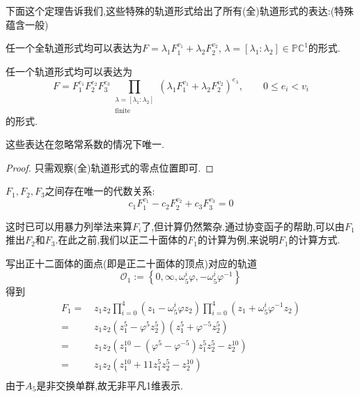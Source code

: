 下面这个定理告诉我们,这些特殊的轨道形式给出了所有(全)轨道形式的表达:(特殊蕴含一般)
\begin{theorem}\label{thm:expr} 任一个全轨道形式均可以表达为$F=\lambda_1F_1^{v_1}+\lambda_2F_2^{v_2}$, $\lambda=[\lambda_1:\lambda_2] \in \mathbb{PC}^1$的形式.
	
	任一个轨道形式均可以表达为
	$$F=F_1^{e_1}F_2^{e_2}F_3^{e_3}\prod_{\substack{\lambda=[\lambda_1:\lambda_2]\\\text{finite}}}(\lambda_1F_1^{v_1}+\lambda_2F_2^{v_2})^{e_{\lambda}},\qquad 0 \leqslant e_i < v_i$$
	的形式.
	
	这些表达在忽略常系数的情况下唯一.
\end{theorem}
\begin{proof}
	只需观察(全)轨道形式的零点位置即可.
\end{proof}
\begin{corollary}
	$F_1,F_2,F_3$之间存在唯一的代数关系:
	$$c_1F_1^{v_1}-c_2F_2^{v_2}+c_3F_3^{v_3}=0$$
\end{corollary}
这时已可以用暴力列举法来算$F_i$了,但计算仍然繁杂.通过协变函子的帮助,可以由$F_1$推出$F_2$和$F_3$.在此之前,我们以正二十面体的$F_1$的计算为例,来说明$F_1$的计算方式.
\begin{example1}[正二十面体的$F_1$]
	写出正十二面体的面点(即是正二十面体的顶点)对应的轨道
	$$\mathcal{O}_1:=\left\{0,\infty,\omega_5^i\varphi,-\omega_5^i\varphi^{-1} \right\}$$
	得到
	\begin{equation*}
	\begin{aligned}
	F_1 = \,& z_1z_2 \prod_{i=0}^{4}(z_1-\omega_5^i\varphi z_2) \prod_{i=0}^{4}(z_1+\omega_5^i\varphi^{-1} z_2) \\
	= \,& z_1z_2(z_1^5-\varphi^5 z_2^5)(z_1^5+\varphi^{-5}z_2^5)\\
	= \,& z_1z_2(z_1^{10}-(\varphi^5-\varphi^{-5})z_1^5z_2^5-z_2^{10})\\
	= \,& z_1z_2(z_1^{10}+11z_1^5z_2^5-z_2^{10})\\
	\end{aligned}
	\end{equation*}
	由于$A_5$是非交换单群,故无非平凡1维表示.
\end{example1}
